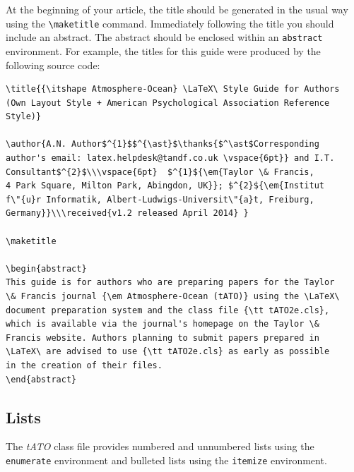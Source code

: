 \documentclass{tATO2e}
\begin{document}
At the beginning of your article, the title should be generated in the usual way using the {\verb"\maketitle"}
command. Immediately following the title you should include an abstract. The abstract should be enclosed within
an {\tt abstract} environment. For example, the titles for this guide were produced by the following source code:
%
\begin{verbatim}
\title{{\itshape Atmosphere-Ocean} \LaTeX\ Style Guide for Authors
(Own Layout Style + American Psychological Association Reference Style)}

\author{A.N. Author$^{1}$$^{\ast}$\thanks{$^\ast$Corresponding
author's email: latex.helpdesk@tandf.co.uk \vspace{6pt}} and I.T.
Consultant$^{2}$\\\vspace{6pt}  $^{1}${\em{Taylor \& Francis,
4 Park Square, Milton Park, Abingdon, UK}}; $^{2}${\em{Institut
f\"{u}r Informatik, Albert-Ludwigs-Universit\"{a}t, Freiburg,
Germany}}\\\received{v1.2 released April 2014} }

\maketitle

\begin{abstract}
This guide is for authors who are preparing papers for the Taylor
\& Francis journal {\em Atmosphere-Ocean (tATO)} using the \LaTeX\
document preparation system and the class file {\tt tATO2e.cls},
which is available via the journal's homepage on the Taylor \&
Francis website. Authors planning to submit papers prepared in
\LaTeX\ are advised to use {\tt tATO2e.cls} as early as possible
in the creation of their files.
\end{abstract}
\end{verbatim}


\subsection{Lists}

The {\it tATO} class file provides numbered and unnumbered lists using the {\tt enumerate} environment and bulleted
lists  using the {\tt itemize} environment.
\end{document}
